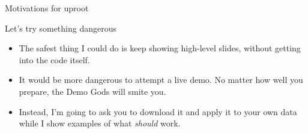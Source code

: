 \documentclass[aspectratio=169]{beamer}
\begin{document}
\begin{frame}{Motivations for uproot}
\vspace{0.25 cm}
\begin{center}
\end{center}
\end{frame}

\begin{frame}{Let's try something dangerous}
\vspace{0.5 cm}
\Large
\begin{itemize}\setlength{\itemsep}{0.3 cm}
\item The safest thing I could do is keep showing high-level slides, without getting into the code itself.
\item<2-> It would be more dangerous to attempt a live demo. No matter how well you prepare, the Demo Gods will smite you.
\item<3-> Instead, I'm going to ask you to download it and apply it to your own data while I show examples of what {\it should} work.
\end{itemize}

\large
\vspace{0.5 cm}
\end{frame}
\end{document}
